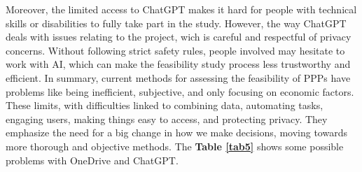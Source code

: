 \vskip 0.5cm
Moreover, the limited access to ChatGPT makes it hard for people with technical skills or disabilities to fully take part in the study. However, the way ChatGPT deals with issues relating to the project, wich is careful and respectful of privacy concerns. Without following strict safety rules, people involved may hesitate to work with AI, which can make the feasibility study process less trustworthy and efficient.
\vskip 0.5cm
In summary, current methods for assessing the feasibility of PPPs have problems like being inefficient, subjective, and only focusing on economic factors. These limits, with difficulties linked to combining data, automating tasks, engaging users, making things easy to access, and protecting privacy. They emphasize the need for a big change in how we make decisions, moving towards more thorough and objective methods.
\vskip 0.5cm
The \textbf{Table \ref{tab5} } shows some possible problems with OneDrive and ChatGPT.
